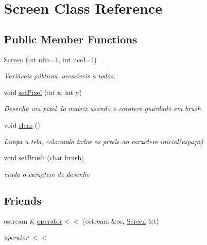 \hypertarget{classScreen}{}\section{Screen Class Reference}
\label{classScreen}
\subsection*{Public Member Functions}
\begin{DoxyCompactItemize}
\item 
\hyperlink{classScreen_ac5aad1a42b786eae7163115101f105d2}{Screen} (int nlin=1, int ncol=1)
\begin{DoxyCompactList}\small\item\em Variáveis públicas, acessíveis a todos. \end{DoxyCompactList}\item 
void \hyperlink{classScreen_ae6bea81c57a22d226507c3c26fa95ee0}{set\+Pixel} (int x, int y)
\begin{DoxyCompactList}\small\item\em Desenha um pixel da matriz usando o caratere guardado em \textquotesingle{}brush\textquotesingle{}. \end{DoxyCompactList}\item 
void \hyperlink{classScreen_a35e74266b2a04e37b354ceff7a5f1031}{clear} ()
\begin{DoxyCompactList}\small\item\em Limpa a tela, colocando todos os pixels no caractere inicial(espaço) \end{DoxyCompactList}\item 
void \hyperlink{classScreen_a14a00e158f99df199772172554a20576}{set\+Brush} (char brush)
\begin{DoxyCompactList}\small\item\em muda o caractere de desenho \end{DoxyCompactList}\end{DoxyCompactItemize}
\subsection*{Friends}
\begin{DoxyCompactItemize}
\item 
ostream \& \hyperlink{classScreen_aab6a2880746bfe1b7964817cc8f0989e}{operator$<$$<$} (ostream \&os, \hyperlink{classScreen}{Screen} \&t)
\begin{DoxyCompactList}\small\item\em operator $<$$<$ \end{DoxyCompactList}\end{DoxyCompactItemize}


